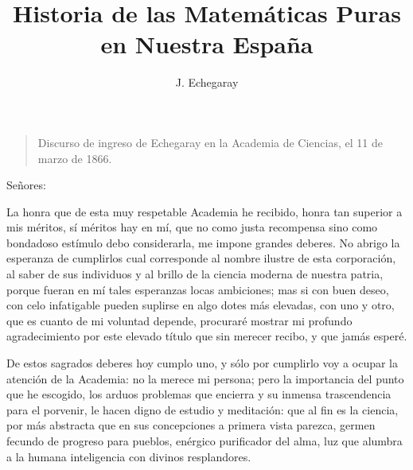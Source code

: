 \documentclass[a4paper, 12pt]{article}
\title{Historia de las Matemáticas Puras en Nuestra España}
\author{J. Echegaray}
\date{}
\begin{document}
\begin{tcolorbox}[colback=blue!5!white,colframe=blue!75!black]

\vspace{-1.8cm}
\textbf \maketitle

\end{tcolorbox}

\bigskip



\begin{quote}\it

Discurso de ingreso de Echegaray en la Academia de Ciencias, el 11 de marzo de 1866.

\end{quote}


\bigskip


Señores:

La honra que de esta muy respetable Academia he recibido, honra tan superior a mis méritos, sí méritos hay en mí, que no como justa recompensa sino como bondadoso estímulo debo considerarla, me impone grandes deberes.  No abrigo la esperanza de cumplirlos cual corresponde al nombre ilustre de esta corporación, al saber de sus individuos y al brillo de la ciencia moderna de nuestra patria, porque fueran en mí tales esperanzas locas ambiciones; mas si con buen deseo, con celo infatigable pueden suplirse en algo dotes más elevadas, con uno y otro, que es cuanto de mi voluntad depende, procuraré mostrar mi profundo agradecimiento por este elevado título que sin merecer recibo, y que jamás esperé.

De estos sagrados deberes hoy cumplo uno, y sólo por cumplirlo voy a ocupar la atención de la Academia: no la merece mi persona; pero la importancia del punto que he escogido, los arduos problemas que encierra y su inmensa trascendencia para el porvenir, le hacen digno de estudio y meditación: que al fin es la ciencia, por más abstracta que en sus concepciones a primera vista parezca, germen fecundo de progreso para pueblos, enérgico purificador del alma, luz que alumbra a la humana inteligencia con divinos resplandores.
\end{document}
